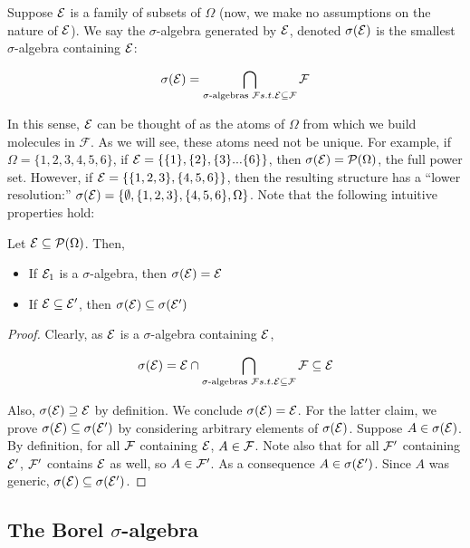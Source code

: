 Suppose $\mathcal E$ is a family of subsets of $\Omega$ (now, we make no assumptions on the 
nature of $\mathcal E$). We say the $\sigma$-algebra generated by $\mathcal E$, denoted $\sigma(\mathcal E)$ is 
the smallest $\sigma$-algebra containing $\mathcal E$: 

\[ \sigma(\mathcal E) = \bigcap_{\text{$\sigma$-algebras } \mathcal F s.t. \mathcal E \subseteq \mathcal F}\mathcal F \]

In this sense, $\mathcal E$ can be thought of as the atoms of $\Omega$ from which we build 
molecules in $\mathcal F$. As we will see, these atoms need not be unique. For example, if 
$\Omega = \{1,2,3,4,5,6\}$, if $\mathcal E = \{\{1\},\{2\},\{3\}...\{6\}\}$, then $\sigma(\mathcal E) = \mathcal P(\Omega)$, the 
full power set. However, if $\mathcal E = \{\{1,2,3\}, \{4,5,6\}\}$, then the resulting structure has a ``lower resolution:''
 $\sigma(\mathcal E) = \{\emptyset, \{1,2,3\},\{4,5,6\}, \Omega\}$. Note that the following 
 intuitive properties hold: 

 \begin{lemma}
    Let $\mathcal E \subseteq \mathcal P(\Omega)$. Then, 
    \begin{itemize}
        \item If $\mathcal E_1$ is a $\sigma$-algebra, then $\sigma(\mathcal E) = \mathcal E$ 
        \item If $\mathcal E \subseteq \mathcal E'$, then $\sigma(\mathcal E) \subseteq \sigma(\mathcal E')$
    \end{itemize}
\end{lemma}

\begin{proof}
    Clearly, as $\mathcal E$ is a $\sigma$-algebra containing $\mathcal E$, 

    \[ \sigma(\mathcal E) = \mathcal E \cap \bigcap_{\text{$\sigma$-algebras } \mathcal F s.t. \mathcal E \subseteq \mathcal F}\mathcal F \subseteq \mathcal E \]

    Also, $\sigma(\mathcal E) \supseteq \mathcal E$ by definition. We conclude $\sigma(\mathcal E) = \mathcal E$. For the latter claim, 
    we prove $\sigma(\mathcal E) \subseteq \sigma(\mathcal E')$ by considering arbitrary elements of 
    $\sigma(\mathcal E)$. Suppose $A \in \sigma(\mathcal E)$. By definition, for all $\mathcal F$ containing $\mathcal E$, $A \in \mathcal F$. 
    Note also that for all $\mathcal F'$ containing $\mathcal E'$, $\mathcal F'$ contains $\mathcal E$ as well, so $A \in \mathcal F'$. 
    As a consequence $A \in \sigma(\mathcal E')$. Since $A$ was generic, $\sigma(\mathcal E) \subseteq \sigma(\mathcal E')$.


\end{proof}


\subsection{The Borel $\sigma$-algebra}

